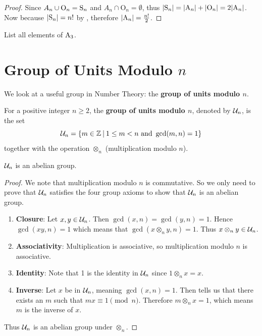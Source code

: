 \begin{proof}
    Since $A_n \cup \mathrm{O}_n = \mathrm{S}_{n}$ and $A_n \cap \mathrm{O}_n = \emptyset$, thus $|\mathrm{S}_{n}| = |\mathrm{A}_{n}| + |\mathrm{O}_n| = 2|\mathrm{A}_{n}|$. Now because $|\mathrm{S}_{n}| = n!$ by , therefore $|\mathrm{A}_{n}| = \frac{n!}2$.
\end{proof}

\begin{exercise}
    List all elements of $\mathrm{A}_{3}$.
\end{exercise}

\section{Group of Units Modulo \texorpdfstring{$n$}{n}}
We look at a useful group in Number Theory: the \textbf{group of units modulo $n$}.

\begin{definition}
    For a positive integer $n \geq 2$, the \textbf{group of units modulo $n$}, denoted by $\mathcal{U}_{n}$, is the set
    \[
        \Un{n} = \{m \in \mathbb{Z} \vert 1 \leq m < n \text{ and } \gcd(m, n) = 1\}
    \]
    together with the operation $\otimes_n$ (multiplication modulo $n$).
\end{definition}

\begin{proposition}
    $\mathcal{U}_{n}$ is an abelian group.
\end{proposition}
\begin{proof}
    We note that multiplication modulo $n$ is commutative. So we only need to prove that $\mathcal{U}_{n}$ satisfies the four group axioms to show that $\mathcal{U}_{n}$ is an abelian group.
    \begin{enumerate}
        \item \textbf{Closure}: Let $x, y \in \mathcal{U}_{n}$. Then $\gcd(x, n) = \gcd(y, n) = 1$. Hence $\gcd(xy, n) = 1$ which means that $\gcd(x\otimes_ny,n)=1$. Thus $x\otimes_ny \in \mathcal{U}_{n}$.
        
        \item \textbf{Associativity}: Multiplication is associative, so multiplication modulo $n$ is associative.
        
        \item \textbf{Identity}: Note that 1 is the identity in $\mathcal{U}_{n}$ since $1 \otimes_n x = x$.
        
        \item \textbf{Inverse}: Let $x$ be in $\mathcal{U}_{n}$, meaning $\gcd(x, n) = 1$. Then  tells us that there exists an $m$ such that $mx \equiv 1 \pmod n$. Therefore $m \otimes_n x = 1$, which means $m$ is the inverse of $x$.
    \end{enumerate}
    Thus $\mathcal{U}_{n}$ is an abelian group under $\otimes_n$.
\end{proof}

